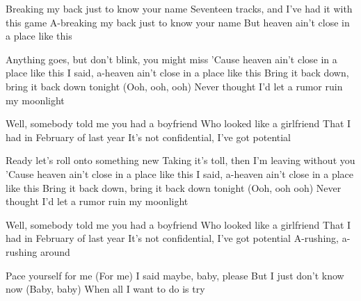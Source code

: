 \medskip

\begin{guitar}
  Breaking my back just to know your name
  Seventeen tracks, and I've had it with this game
  A-breaking my back just to know your name
  But heaven ain't close in a place like this

  Anything goes, but don't blink, you might miss
  'Cause heaven ain't close in a place like this
  I said, a-heaven ain't close in a place like this
  Bring it back down, bring it back down tonight
  (Ooh, ooh, ooh)
  Never thought I'd let a rumor ruin my moonlight

	\begin{highlightbar}
    Well, somebody told me you had a boyfriend
    Who looked like a girlfriend
    That I had in February of last year
    It's not confidential, I've got potential
  \end{highlightbar}

	\songsection{Verse 3}
  Ready let's roll onto something new
  Taking it's toll, then I'm leaving without you
  'Cause heaven ain't close in a place like this
  I said, a-heaven ain't close in a place like this
  Bring it back down, bring it back down tonight
  (Ooh, ooh ooh)
  Never thought I'd let a rumor ruin my moonlight

	\begin{highlightbar}
    Well, somebody told me you had a boyfriend
    Who looked like a girlfriend
    That I had in February of last year
    It's not confidential, I've got potential
    A-rushing, a-rushing around
  \end{highlightbar}

	\songsection{Verse 4}
  Pace yourself for me (For me)
  I said maybe, baby, please
  But I just don't know now (Baby, baby)
  When all I want to do is try

  \begin{highlightbar}
  \end{highlightbar}
\end{guitar}
